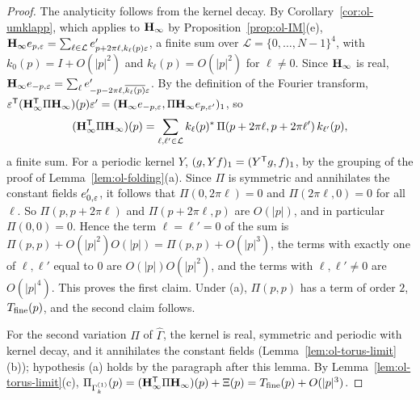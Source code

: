 \begin{proof}
The analyticity follows from the kernel decay. By Corollary~\ref{cor:ol-umklapp}, which applies to $\mathbf H_\infty$ by Proposition~\ref{prop:ol-IM}(e), $\mathbf H_\infty e_{p,\varepsilon}=\sum_{\ell\in\mathcal L}e'_{p+2\pi\ell,k_\ell(p)\varepsilon}$, a finite sum over $\mathcal L=\{0,\dots,N-1\}^4$, with $k_0(p)=I+O(|p|^2)$ and $k_\ell(p)=O(|p|^2)$ for $\ell\ne0$. Since $\mathbf H_\infty$ is real, $\mathbf H_\infty e_{-p,\varepsilon}=\sum_\ell e'_{-p-2\pi\ell,\overline{k_\ell(p)}\varepsilon}$. By the definition of the Fourier transform, $\varepsilon^{\sf T}(\mathbf H_\infty^{\sf T}\Pi\mathbf H_\infty)(p)\varepsilon'=(\mathbf H_\infty e_{-p,\varepsilon},\Pi\mathbf H_\infty e_{p,\varepsilon'})_1$, so
\[
(\mathbf H_\infty^{\sf T}\Pi\mathbf H_\infty)(p)=\sum_{\ell,\ell'\in\mathcal L}k_\ell(p)^*\,\Pi(p+2\pi\ell,p+2\pi\ell')\,k_{\ell'}(p),
\]
a finite sum. For a periodic kernel $Y$, $(g,Yf)_1=(Y^{\sf T}g,f)_1$, by the grouping of the proof of Lemma~\ref{lem:ol-folding}(a). Since $\Pi$ is symmetric and annihilates the constant fields $e'_{0,\varepsilon}$, it follows that $\Pi(0,2\pi\ell)=0$ and $\Pi(2\pi\ell,0)=0$ for all $\ell$. So $\Pi(p,p+2\pi\ell)$ and $\Pi(p+2\pi\ell,p)$ are $O(|p|)$, and in particular $\Pi(0,0)=0$. Hence the term $\ell=\ell'=0$ of the sum is $\Pi(p,p)+O(|p|^2)O(|p|)=\Pi(p,p)+O(|p|^3)$, the terms with exactly one of $\ell,\ell'$ equal to $0$ are $O(|p|)O(|p|^2)$, and the terms with $\ell,\ell'\ne0$ are $O(|p|^4)$. This proves the first claim. Under (a), $\Pi(p,p)$ has a term of order $2$, $T_{\rm fine}(p)$, and the second claim follows.

For the second variation $\Pi$ of $\widehat\Gamma$, the kernel is real, symmetric and periodic with kernel decay, and it annihilates the constant fields (Lemma~\ref{lem:ol-torus-limit}(b)); hypothesis (a) holds by the paragraph after this lemma. By Lemma~\ref{lem:ol-torus-limit}(c), $\Pi_{\Gamma^{(1)}_k}(p)=(\mathbf H_\infty^{\sf T}\Pi\mathbf H_\infty)(p)+\Xi(p)=T_{\rm fine}(p)+O(|p|^3)$.
\end{proof}

